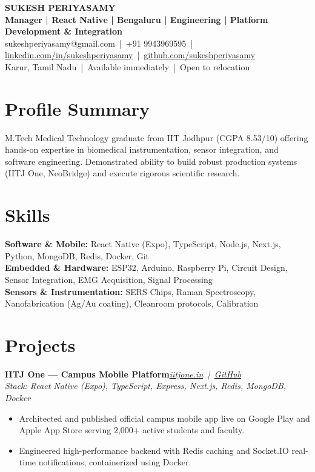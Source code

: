 \documentclass[9.2pt,a4paper]{article}
\newcommand{\role}[3]{\textbf{#1}\hfill\textit{#2}\\[-2pt]\textit{\small #3}\par}
\begin{document}
\begin{center}
{\huge\bfseries SUKESH PERIYASAMY}\\[1.5pt]
{\large\bfseries\color{accent} Manager | React Native | Bengaluru | Engineering | Platform Development \& Integration}\\[1.5pt]
\small sukeshperiyasamy@gmail.com \,|\, +91 9943969595 \,|\, \href{https://linkedin.com/in/sukeshperiyasamy}{linkedin.com/in/sukeshperiyasamy} \,|\, \href{https://github.com/sukeshperiyasamy}{github.com/sukeshperiyasamy}\\
Karur, Tamil Nadu \,|\, Available immediately \,|\, Open to relocation
\end{center}

\section{Profile Summary}
M.Tech Medical Technology graduate from IIT Jodhpur (CGPA 8.53/10) offering hands-on expertise in biomedical instrumentation, sensor integration, and software engineering. Demonstrated ability to build robust production systems (IITJ One, NeoBridge) and execute rigorous scientific research.

\section{Skills}
\textbf{Software \& Mobile:} React Native (Expo), TypeScript, Node.js, Next.js, Python, MongoDB, Redis, Docker, Git\\
\textbf{Embedded \& Hardware:} ESP32, Arduino, Raspberry Pi, Circuit Design, Sensor Integration, EMG Acquisition, Signal Processing\\
\textbf{Sensors \& Instrumentation:} SERS Chips, Raman Spectroscopy, Nanofabrication (Ag/Au coating), Cleanroom protocols, Calibration

\section{Projects}
\role{IITJ One --- Campus Mobile Platform}{\href{https://iitjone.in}{iitjone.in} \,|\, \href{https://github.com/Godevs04/IITJ_One}{GitHub}}{Stack: React Native (Expo), TypeScript, Express, Next.js, Redis, MongoDB, Docker}
\begin{itemize}
  \item Architected and published official campus mobile app live on Google Play and Apple App Store serving 2,000+ active students and faculty.
  \item Engineered high-performance backend with Redis caching and Socket.IO real-time notifications, containerized using Docker.
\end{itemize}
\end{document}
